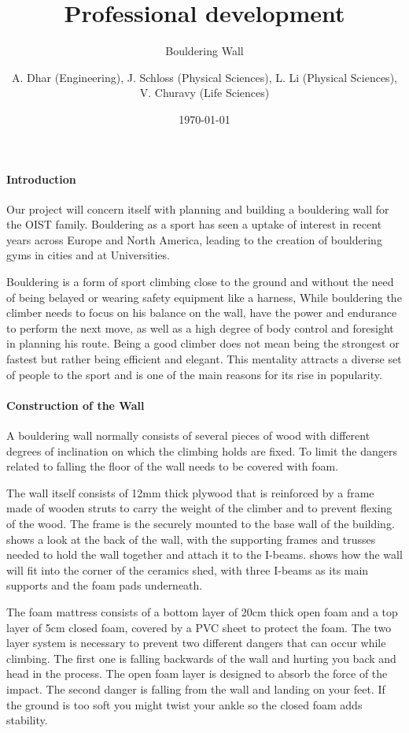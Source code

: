 \documentclass[a4paper, 12pt]{scrartcl}
\date{\today}
\title{Professional development}
\subtitle{Bouldering Wall}
\author{A. Dhar (Engineering), J. Schloss (Physical Sciences), L. Li (Physical Sciences), V. Churavy (Life Sciences)}
\begin{document}
\maketitle
\paragraph{Introduction}
Our project will concern itself with planning and building a bouldering wall for the OIST family.
Bouldering as a sport has seen a uptake of interest in recent years across Europe and North America, leading to the creation of bouldering gyms in cities and at Universities. 

Bouldering is a form of sport climbing close to the ground and without the need of being belayed or wearing safety equipment like a harness, While bouldering the climber needs to focus on his balance on the wall, have the power and endurance to perform the next move, as well as a high degree of body control and foresight in planning his route. Being a good climber does not mean being the strongest or fastest but rather being efficient and elegant. This mentality attracts a diverse set of people to the sport and is one of the main reasons for its rise in popularity.

\paragraph{Construction of the Wall}
A bouldering wall normally consists of several pieces of wood with different degrees of inclination on which the climbing holds are fixed. To limit the dangers related to falling the floor of the wall needs to be covered with foam.

The wall itself consists of 12mm thick plywood that is reinforced by a frame made of wooden struts to carry the weight of the climber and to prevent flexing of the wood. The frame is the securely mounted to the base wall of the building. 
 shows a look at the back of the wall, with the supporting frames and trusses needed to hold the wall together and attach it to the I-beams.  shows how the wall will fit into the corner of the ceramics shed, with three I-beams as its main supports and the foam pads underneath.

The foam mattress consists of a bottom layer of 20cm thick open foam and a top layer of 5cm closed foam, covered by a PVC sheet to protect the foam.
The two layer system is necessary to prevent two different dangers that can occur while climbing. The first one is falling backwards of the wall and hurting you back and head in the process. The open foam layer is designed to absorb the force of the impact. The second danger is falling from the wall and landing on your feet. If the ground is too soft you might twist your ankle so the closed foam adds stability.
\end{document}
